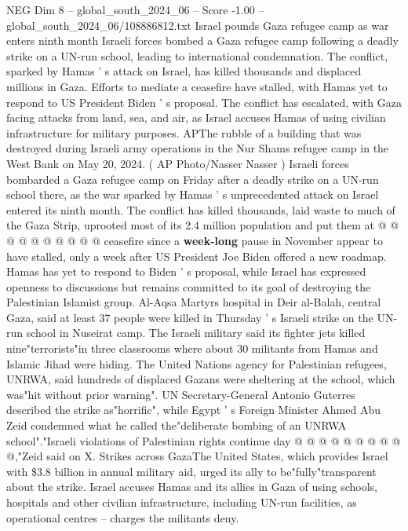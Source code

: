 \begin{textsample}{NEG Dim 8 – global\_south\_2024\_06 – Score -1.00 – global\_south\_2024\_06/108886812.txt}  \label{ex:f8_neg_042}
Israel pounds Gaza refugee camp as war enters ninth month Israeli forces bombed a Gaza refugee camp following a deadly strike on a UN-run school, leading to international condemnation.
The conflict, sparked by Hamas ' s attack on Israel, has killed thousands and displaced millions in Gaza.
Efforts to mediate a ceasefire have stalled, with Hamas yet to respond to US President Biden ' s proposal.
The conflict has escalated, with Gaza facing attacks from land, sea, and air, as Israel accuses Hamas of using civilian infrastructure for military purposes.
APThe rubble of a building that was destroyed during Israeli army operations in the Nur Shams refugee camp in the West Bank on May 20, 2024. ( AP Photo/Nasser Nasser ) Israeli forces bombarded a Gaza refugee camp on Friday after a deadly strike on a UN-run school there, as the war sparked by Hamas ' s unprecedented attack on Israel entered its ninth month.
The conflict has killed thousands, laid waste to much of the Gaza Strip, uprooted most of its 2.4 million population and put them at @ @ @ @ @ @ @ @ @ @ ceasefire since a \textbf{week-long} pause in November appear to have stalled, only a week after US President Joe Biden offered a new roadmap.
Hamas has yet to respond to Biden ' s proposal, while Israel has expressed openness to discussions but remains committed to its goal of destroying the Palestinian Islamist group.
Al-Aqsa Martyrs hospital in Deir al-Balah, central Gaza, said at least 37 people were killed in Thursday ' s Israeli strike on the UN-run school in Nuseirat camp.
The Israeli military said its fighter jets killed nine"terrorists"in three classrooms where about 30 militants from Hamas and Islamic Jihad were hiding.
The United Nations agency for Palestinian refugees, UNRWA, said hundreds of displaced Gazans were sheltering at the school, which was"hit without prior warning".
UN Secretary-General Antonio Guterres described the strike as"horrific", while Egypt ' s Foreign Minister Ahmed Abu Zeid condemned what he called the"deliberate bombing of an UNRWA school"."Israeli violations of Palestinian rights continue day @ @ @ @ @ @ @ @ @ @,"Zeid said on X.
Strikes across GazaThe United States, which provides Israel with \$3.8 billion in annual military aid, urged its ally to be"fully"transparent about the strike.
Israel accuses Hamas and its allies in Gaza of using schools, hospitals and other civilian infrastructure, including UN-run facilities, as operational centres -- charges the militants deny.

\end{textsample}
